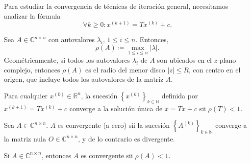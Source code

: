 \begin{frame}
	Para estudiar la convergencia de técnicas de iteración general,
	necesitamos analizar la fórmula
	\begin{equation*}
		\boxed{
			\forall k\geq0:
			x^{\left(k+1\right)}=
			Tx^{\left(k\right)}+c.
		}
	\end{equation*}

	\begin{definition}
		Sea $A\in\mathbb{C}^{n\times n}$ con autovalores $\lambda_{i}$,
		$1\leq i\leq n$.
		Entonces,
		\begin{equation*}
			\rho\left(A\right)\coloneqq
			\max_{1\leq i\leq n}\left|\lambda\right|.
		\end{equation*}
		Geométricamente, si todos los autovalores $\lambda_{i}$ de $A$
		son ubicados en el $z$-plano complejo, entonces
		$\rho\left(A\right)$ es el radio del menor disco
		$\left|z\right|\leq R$, con centro en el origen, que incluye
		todos los autovalores de la matriz $A$.
	\end{definition}

	\begin{theorem}
		Para cualquier $x^{\left(0\right)}\in\mathbb{R}^{n}$, la sucesión
		\begin{math}
			{\left\{x^{\left(k\right)}\right\}}_{k\in\mathbb{N}}
		\end{math}
		definida por
		\begin{math}
			x^{\left(k+1\right)}=
			Tx^{\left(k\right)}+
			c
		\end{math}
		converge a la \alert{solución única} de $x=Tx+c$ sii
		$\rho\left(T\right)<1$.

		\begin{definition}
			Sea $A\in\mathbb{C}^{n\times n}$.
			$A$ es \alert{convergente}
			(\alert{a cero}) sii la sucesión
			\begin{math}
				{\left\{A^{\left(k\right)}\right\}}_{k\in\mathbb{N}}
			\end{math}
			converge a la matriz nula $O\in\mathbb{C}^{n\times n}$, y de lo
			contrario es divergente.
		\end{definition}

		\begin{theorem}
			Si $A\in\mathbb{C}^{n\times n}$, entonces $A$ es convergente sii
			$\rho\left(A\right)<1$.
		\end{theorem}


\end{theorem}
\end{frame}
